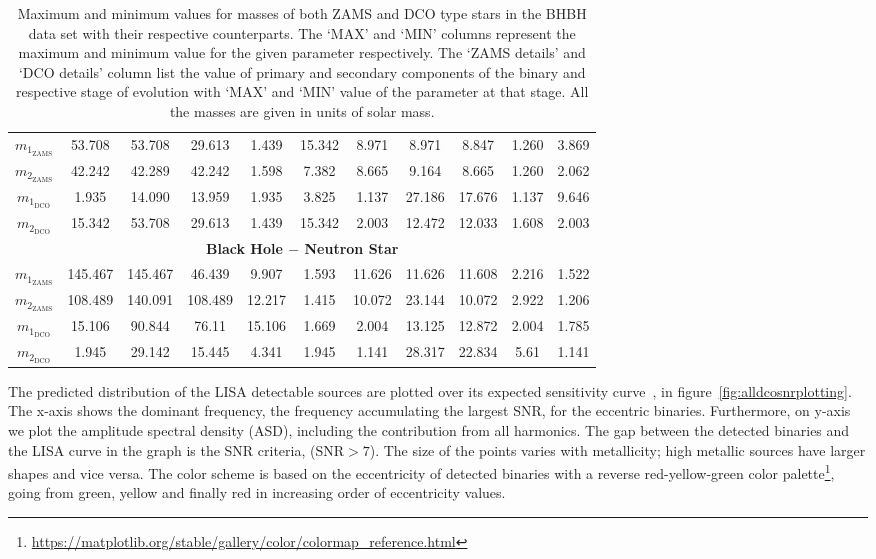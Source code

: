 \documentclass[journal, twocolumns]{IEEEtran}
\newcommand{\mone}[1]{m_{1_{\text{#1}}}}
\newcommand{\mtwo}[1]{m_{2_{\text{#1}}}}
\begin{document}
\begin{table}[!h]
{\begin{tabular}{@{}ccccccccccc@{}}
                $\mone{ZAMS}$ & 53.708  & 53.708  & 29.613    & 1.439   & 15.342    & 8.971  & 8.971   & 8.847     & 1.260   & 3.869     \\
                $\mtwo{ZAMS}$ & 42.242  & 42.289  & 42.242    & 1.598   & 7.382     & 8.665  & 9.164   & 8.665     & 1.260   & 2.062     \\
                $\mone{DCO}$  & 1.935   & 14.090  & 13.959    & 1.935   & 3.825     & 1.137  & 27.186  & 17.676    & 1.137   & 9.646     \\
                $\mtwo{DCO}$  & 15.342  & 53.708  & 29.613    & 1.439   & 15.342    & 2.003  & 12.472  & 12.033    & 1.608   & 2.003     \\

                \multicolumn{11}{c}{\textbf{Black Hole $-$ Neutron Star}} \\

                $\mone{ZAMS}$ & 145.467 & 145.467 & 46.439    & 9.907   & 1.593     & 11.626 & 11.626  & 11.608    & 2.216   & 1.522     \\
                $\mtwo{ZAMS}$ & 108.489 & 140.091 & 108.489   & 12.217  & 1.415     & 10.072 & 23.144  & 10.072    & 2.922   & 1.206     \\
                $\mone{DCO}$  & 15.106  & 90.844  & 76.11     & 15.106  & 1.669     & 2.004  & 13.125  & 12.872    & 2.004   & 1.785     \\
                $\mtwo{DCO}$  & 1.945   & 29.142  & 15.445    & 4.341   & 1.945     & 1.141  & 28.317  & 22.834    & 5.61    & 1.141     \\ \bottomrule
            \end{tabular}%
        }
        \caption{Maximum and minimum values for masses of both ZAMS and DCO type stars in the BHBH data set with their respective counterparts. The `MAX' and `MIN' columns represent the maximum and minimum value for the given parameter respectively. The `ZAMS details' and `DCO details' column list the value of primary and secondary components of the binary and respective stage of evolution with `MAX' and `MIN' value of the parameter at that stage. All the masses are given in units of solar mass.}
        \label{tab:bhbh-details-table}
    \end{table}

    The predicted distribution of the LISA detectable sources are plotted over its expected sensitivity curve~\cite{Robson2019}, in figure~\ref{fig:alldcosnrplotting}.
    The x-axis shows the dominant frequency, the frequency accumulating the largest SNR, for the eccentric binaries.
    Furthermore, on y-axis we plot the amplitude spectral density (ASD), including the contribution from all harmonics.
    The gap between the detected binaries and the LISA curve in the graph is the SNR criteria, ($\text{SNR}>7$).
    The size of the points varies with metallicity; high metallic sources have larger shapes and vice versa.
    The color scheme is based on the eccentricity of detected binaries with a reverse red-yellow-green color palette\footnote{\url{https://matplotlib.org/stable/gallery/color/colormap_reference.html}}, going from green, yellow and finally red in increasing order of eccentricity values.
\end{document}
